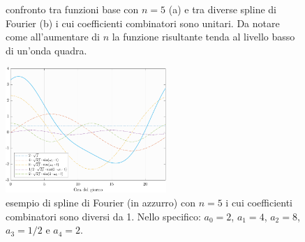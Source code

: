 \begin{figure}[htp]
	\centering
	\quad
	\caption[Confronto tra funzioni base con $n=5$ e tra diverse spline di Fourier]{confronto tra funzioni base con $n = 5$ (a) e tra diverse spline di Fourier (b) i cui coefficienti combinatori sono unitari. Da notare come all'aumentare di $n$ la funzione risultante tenda al livello basso di un'onda quadra.}
	\label{esempi_Fourier}
\end{figure}
\begin{figure}[htp]
	\centering
	\includegraphics[height=180px]{Immagini/Modello base/Spline Fourier con coefficienti non unitari}
	\caption[Esempio di spline di Fourier con $n=5$ i cui coefficienti combinatori sono diversi da \num{1}]{esempio di spline di Fourier (in azzurro) con $n=5$ i cui coefficienti combinatori sono diversi da \num{1}. Nello specifico: $a_0 = 2$, $a_1 = 4$, $a_2 = 8$, $a_3 = 1/2$ e $a_4 = 2$.}
	\label{esempio_Fourier_coef_non_unitari}
\end{figure}

